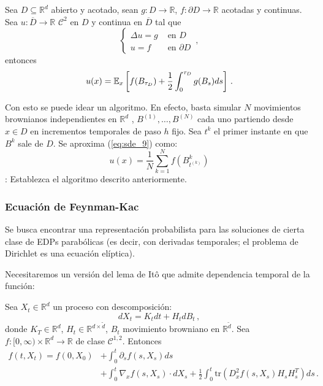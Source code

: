 \begin{theorem}
    Sea $D \subseteq \mathbb{R}^{d}$ abierto y acotado, sean $g : D \to \mathbb{R}$, $f : \partial D \to  \mathbb{R}$ acotadas y continuas. Sea $u : \overline{D} \to  \mathbb{R}$ $\mathcal{C}^2$ en $D$ y continua en $\overline{D}$ tal que 
    \begin{equation*}
        \begin{cases}
            \Delta u = g & \text{ en } D \\
            u = f & \text{ en } \partial D
        \end{cases} \,,
    \end{equation*}
    entonces 
    \begin{equation*}
        u(x) = \mathbb{E}_{x} \left[ f(B_{\tau_D}) + \frac{1}{2} \int_{0}^{\tau_D} g(B_s) ds \right] \,.
    \end{equation*}
\end{theorem}

Con esto se puede idear un algoritmo. En efecto, basta simular $N$ movimientos brownianos independientes en $\mathbb{R}^{d}$ , $B^{(1)}, \ldots, B^{(N)}$ cada uno partiendo desde $x \in D$ en incrementos temporales de paso $h$ fijo. Sea $t^{k}$ el primer instante en que $B^{k}$ sale de $D$. Se aproxima (\ref{eq:sde_9}) como: 
\begin{equation*}
    u(x) = \frac{1}{N} \sum_{k=1}^{N} f(B_{t^{(k)}}^{k}) 
\end{equation*}
\ejercicio \gris : Establezca el algoritmo descrito anteriormente. \negro

\subsubsection{Ecuación de Feynman-Kac}
Se busca encontrar una representación probabilista para las soluciones de cierta clase de EDPs parabólicas (es decir, con derivadas temporales; el problema de Dirichlet es una ecuación elíptica). 

\newp Necesitaremos un versión del lema de It\^{o} que admite dependencia temporal de la función:
\begin{theorem}[Lema de It\^{o}]
Sea $X_t \in \mathbb{R}^{d}$  un proceso con descomposición: 
\begin{equation*}
    dX_t = K_t dt + H_t dB_t \,,
\end{equation*}
donde $K_T \in \mathbb{R}^{d}$, $H_t \in \mathbb{R}^{d \times \tilde{d}}$, $B_t$ movimiento browniano en $\mathbb{R}^{\tilde{d}}$. Sea $f : [0, \infty) \times  \mathbb{R}^{d} \to \mathbb{R}$ de clase $\mathcal{C}^{1,2}$. Entonces
\begin{align*}
    f(t,X_t) = f(0,X_0) & + \int_{0}^{t} \partial_s f(s,X_s) ds \\ 
    & + \int_{0}^{t} \nabla_{x} f(s, X_s) \cdot dX_s + \frac{1}{2} \int_{0}^{t} \text{tr}( D^2_x f(s,X_s)H_s H_s^T) ds \,.
\end{align*}
\end{theorem}

